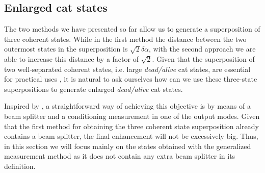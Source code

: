 \subsection{Enlarged cat states}
The two methods we have presented so far allow us to generate a superposition of three coherent states. While in the first method the distance between the two outermost states in the superposition is $\sqrt{2}\delta \alpha$, with the second approach we are able to increase this distance by a factor of $\sqrt{2}$. Given that the superposition of two well-separated coherent states, i.e. large \emph{dead/alive} cat states, are essential for practical uses \cite{Gilchrist2004}, it is natural to ask ourselves how can we use these three-state superpositions to generate enlarged \emph{dead/alive} cat states.

Inspired by \cite{Laghout2013, Sychev2017}, a straightforward way of achieving this objective is by means of a beam splitter and a conditioning measurement in one of the output modes. Given that the first method for obtaining the three coherent state superposition already contains a beam splitter, the final enhancement will not be excessively big. Thus, in this section we will focus mainly on the states obtained with the generalized measurement method as it does not contain any extra beam splitter in its definition. 

